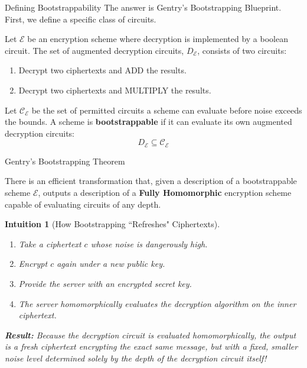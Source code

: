 \documentclass[10pt]{beamer}
\newtheorem{intuition}{Intuition}
\begin{document}
\begin{frame}{Defining Bootstrappability}
    The answer is Gentry's Bootstrapping Blueprint. First, we define a specific class of circuits.
    \pause

    \vspace{0.3cm}
    \begin{definition}
    Let $\mathcal{E}$ be an encryption scheme where decryption is implemented by a boolean circuit. The set of augmented decryption circuits, $D_{\mathcal{E}}$, consists of two circuits: 
    \begin{enumerate}
        \item Decrypt two ciphertexts and ADD the results.
        \item Decrypt two ciphertexts and MULTIPLY the results.
    \end{enumerate}
    \end{definition}
    \pause

    \vspace{0.3cm}
    \begin{definition}
    Let $\mathcal{C}_{\mathcal{E}}$ be the set of permitted circuits a scheme can evaluate before noise exceeds the bounds. A scheme is \textbf{bootstrappable} if it can evaluate its own augmented decryption circuits:
    $$D_{\mathcal{E}} \subseteq \mathcal{C}_{\mathcal{E}}$$
    \end{definition}
\end{frame}

\begin{frame}{Gentry's Bootstrapping Theorem}
    \begin{theorem}
    There is an efficient transformation that, given a description of a bootstrappable scheme $\mathcal{E}$, outputs a description of a \textbf{Fully Homomorphic} encryption scheme capable of evaluating circuits of any depth.
    \end{theorem}
    \pause
    
    \vspace{0.3cm}
    \begin{intuition}[How Bootstrapping ``Refreshes" Ciphertexts]
    \begin{enumerate}
        \item Take a ciphertext $c$ whose noise is dangerously high.
        \item Encrypt $c$ \textit{again} under a new public key.
        \item Provide the server with an \textit{encrypted} secret key.
        \item The server homomorphically evaluates the decryption algorithm on the inner ciphertext.
    \end{enumerate}
    \pause
    \textbf{Result:} Because the decryption circuit is evaluated homomorphically, the output is a fresh ciphertext encrypting the exact same message, but with a fixed, smaller noise level determined solely by the depth of the decryption circuit itself!
    \end{intuition}
\end{frame}
\end{document}
